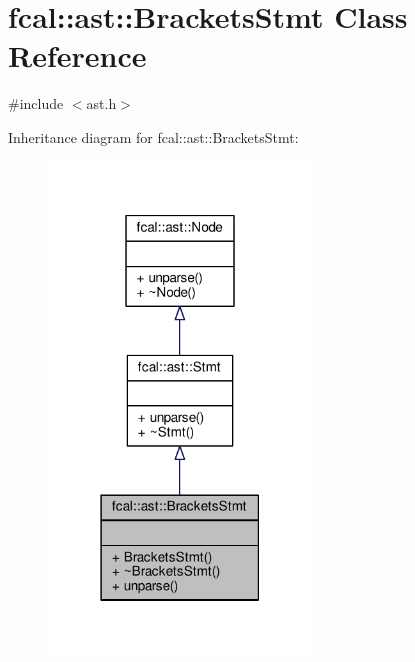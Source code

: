 \hypertarget{classfcal_1_1ast_1_1BracketsStmt}{}\section{fcal\+:\+:ast\+:\+:Brackets\+Stmt Class Reference}
\label{classfcal_1_1ast_1_1BracketsStmt}


{\ttfamily \#include $<$ast.\+h$>$}



Inheritance diagram for fcal\+:\+:ast\+:\+:Brackets\+Stmt\+:
\nopagebreak
\begin{figure}[H]
\begin{center}
\leavevmode
\includegraphics[width=198pt]{classfcal_1_1ast_1_1BracketsStmt__inherit__graph}
\end{center}
\end{figure}


